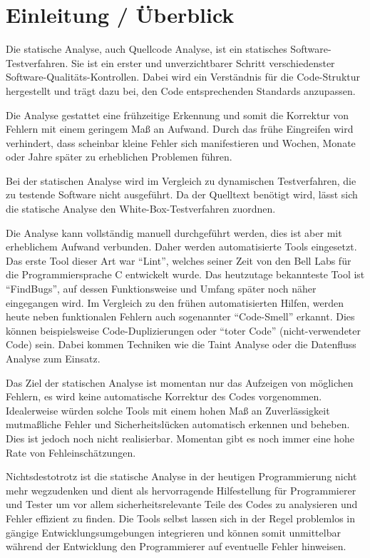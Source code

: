 \section{Einleitung / \"Uberblick}
Die statische Analyse, auch Quellcode Analyse, ist ein statisches Software-Testverfahren. Sie ist ein erster und unverzichtbarer Schritt verschiedenster Software-Qualitäts-Kontrollen. Dabei wird ein Verständnis für die Code-Struktur hergestellt und trägt dazu bei, den Code entsprechenden Standards anzupassen.

Die Analyse gestattet eine frühzeitige Erkennung und somit die Korrektur von Fehlern mit einem geringem Maß an Aufwand. Durch das frühe Eingreifen wird verhindert, dass scheinbar kleine Fehler sich manifestieren und Wochen, Monate oder Jahre später zu erheblichen Problemen führen.

Bei der statischen Analyse wird im Vergleich zu dynamischen Testverfahren, die zu testende Software nicht ausgeführt. Da der Quelltext benötigt wird, lässt sich die statische Analyse den White-Box-Testverfahren zuordnen.

Die Analyse kann vollständig manuell durchgeführt werden, dies ist aber mit erheblichem Aufwand verbunden. Daher werden automatisierte Tools eingesetzt. Das erste Tool dieser Art war ``Lint'', welches seiner Zeit von den Bell Labs für die Programmiersprache C entwickelt wurde. Das heutzutage bekannteste Tool ist ``FindBugs'', auf dessen Funktionsweise und Umfang später noch näher eingegangen wird. Im Vergleich zu den frühen automatisierten Hilfen, werden heute neben funktionalen Fehlern auch sogenannter ``Code-Smell'' erkannt. Dies können beispielsweise Code-Duplizierungen oder ``toter Code'' (nicht-verwendeter Code) sein. Dabei kommen Techniken wie die Taint Analyse oder die Datenfluss Analyse zum Einsatz.

Das Ziel der statischen Analyse ist momentan nur das Aufzeigen von möglichen Fehlern, es wird keine automatische Korrektur des Codes vorgenommen. Idealerweise würden solche Tools mit einem hohen Maß an Zuverlässigkeit mutmaßliche Fehler und Sicherheitslücken automatisch erkennen und beheben. Dies ist jedoch noch nicht realisierbar. Momentan gibt es noch immer eine hohe Rate von Fehleinschätzungen.

Nichtsdestotrotz ist die statische Analyse in der heutigen Programmierung nicht mehr wegzudenken und dient als hervorragende Hilfestellung für Programmierer und Tester um vor allem sicherheitsrelevante Teile des Codes zu analysieren und Fehler effizient zu finden.
Die Tools selbst lassen sich in der Regel problemlos in gängige Entwicklungsumgebungen integrieren und können somit unmittelbar während der Entwicklung den Programmierer auf eventuelle Fehler hinweisen.

